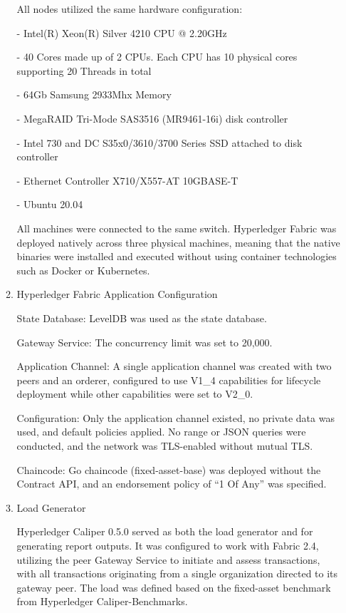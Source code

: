 \documentclass[conference]{IEEEtran}
\begin{document}
\begin{enumerate}[itemsep=2ex, parsep=1ex]
\begin{enumerate}[itemsep=2ex, parsep=1ex]
					All nodes utilized the same hardware configuration:

					- Intel(R) Xeon(R) Silver 4210 CPU @ 2.20GHz

					- 40 Cores made up of 2 CPUs. Each CPU has 10 physical cores supporting
					20 Threads in total

					- 64Gb Samsung 2933Mhx Memory

					- MegaRAID Tri-Mode SAS3516 (MR9461-16i) disk controller

					- Intel 730 and DC S35x0/3610/3700 Series SSD attached to disk
					controller

					- Ethernet Controller X710/X557-AT 10GBASE-T

					- Ubuntu 20.04

					All machines were connected to the same switch. Hyperledger Fabric was
					deployed natively across three physical machines, meaning that the native
					binaries were installed and executed without using container technologies
					such as Docker or Kubernetes.

				\item Hyperledger Fabric Application Configuration

					State Database: LevelDB was used as the state database.

					Gateway Service: The concurrency limit was set to 20,000.

					Application Channel: A single application channel was created with two
					peers and an orderer, configured to use V1\_4 capabilities for lifecycle
					deployment while other capabilities were set to V2\_0.

					Configuration: Only the application channel existed, no private data
					was used, and default policies applied. No range or JSON queries were
					conducted, and the network was TLS-enabled without mutual TLS.

					Chaincode: Go chaincode (fixed-asset-base) was deployed without the
					Contract API, and an endorsement policy of “1 Of Any” was specified.

				\item Load Generator

					Hyperledger Caliper 0.5.0 served as both the load generator and for generating
					report outputs. It was configured to work with Fabric 2.4, utilizing the
					peer Gateway Service to initiate and assess transactions, with all
					transactions originating from a single organization directed to its
					gateway peer. The load was defined based on the fixed-asset benchmark from
					Hyperledger Caliper-Benchmarks.


\end{enumerate}
\end{enumerate}
\end{document}
